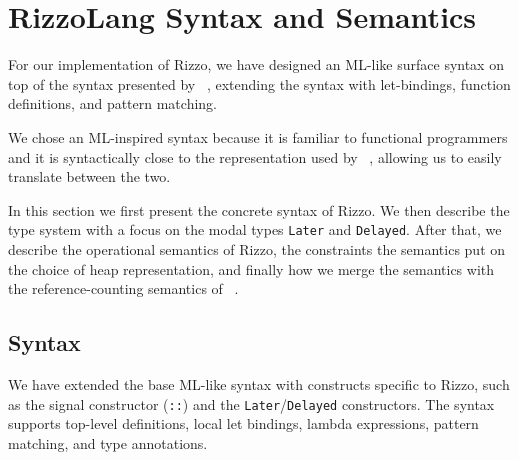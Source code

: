 \section{RizzoLang Syntax and Semantics}\label{section:rizzolang}



For our implementation of Rizzo, we have designed an ML-like surface syntax on top of the syntax presented by \citeauthor*{rizzo_modal_2025}~\cite{rizzo_modal_2025}, extending the syntax with let-bindings, function definitions, and pattern matching.

We chose an ML-inspired syntax because it is familiar to functional programmers and it is syntactically close to the representation used by \citeauthor*{ullrich_counting_2021}~\cite{ullrich_counting_2021}, allowing us to easily translate between the two.

In this section we first present the concrete syntax of Rizzo.
We then describe the type system with a focus on the modal types \texttt{Later} and \texttt{Delayed}. 
After that, we describe the operational semantics of Rizzo, the constraints the semantics put on the choice of heap representation, and finally how we merge the semantics with the reference-counting semantics of \citeauthor*{ullrich_counting_2021}~\cite{ullrich_counting_2021}.

\subsection{Syntax}

We have extended the base ML-like syntax with constructs specific to Rizzo, such as the signal constructor (\texttt{::}) and the \texttt{Later}/\texttt{Delayed} constructors. The syntax supports top-level definitions, local let bindings, lambda expressions, pattern matching, and type annotations.

